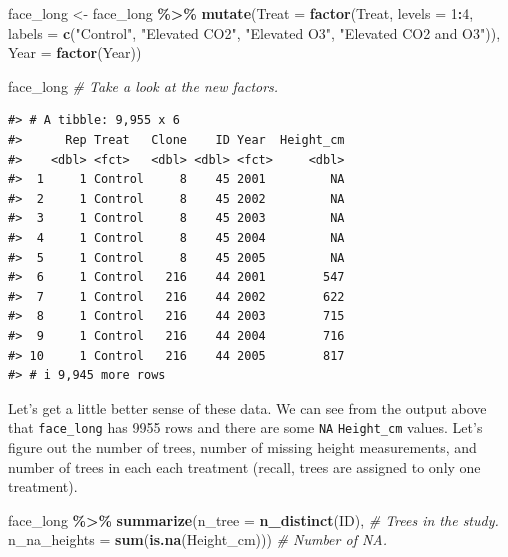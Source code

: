 \documentclass[
  11pt,
]{krantz}
\newenvironment{Shaded}{\begin{snugshade}}{\end{snugshade}}
\newcommand{\CommentTok}[1]{\textcolor[rgb]{0.56,0.35,0.01}{\textit{#1}}}
\newcommand{\DataTypeTok}[1]{\textcolor[rgb]{0.13,0.29,0.53}{#1}}
\newcommand{\DecValTok}[1]{\textcolor[rgb]{0.00,0.00,0.81}{#1}}
\newcommand{\KeywordTok}[1]{\textcolor[rgb]{0.13,0.29,0.53}{\textbf{#1}}}
\newcommand{\NormalTok}[1]{#1}
\newcommand{\OperatorTok}[1]{\textcolor[rgb]{0.81,0.36,0.00}{\textbf{#1}}}
\newcommand{\StringTok}[1]{\textcolor[rgb]{0.31,0.60,0.02}{#1}}
\theoremstyle{definition}
\theoremstyle{definition}
\theoremstyle{definition}
\theoremstyle{definition}
\theoremstyle{remark}
\begin{document}
\begin{Shaded}
\begin{Highlighting}[]
\NormalTok{face\_long \textless{}{-}}\StringTok{ }\NormalTok{face\_long }\OperatorTok{\%\textgreater{}\%}\StringTok{ }
\StringTok{  }\KeywordTok{mutate}\NormalTok{(}\DataTypeTok{Treat =} \KeywordTok{factor}\NormalTok{(Treat, }\DataTypeTok{levels =} \DecValTok{1}\OperatorTok{:}\DecValTok{4}\NormalTok{,}
                        \DataTypeTok{labels =} \KeywordTok{c}\NormalTok{(}\StringTok{"Control"}\NormalTok{, }\StringTok{"Elevated CO2"}\NormalTok{, }
                                   \StringTok{"Elevated O3"}\NormalTok{, }
                                   \StringTok{"Elevated CO2 and O3"}\NormalTok{)),}
         \DataTypeTok{Year =} \KeywordTok{factor}\NormalTok{(Year))}

\NormalTok{face\_long }\CommentTok{\# Take a look at the new factors.}
\end{Highlighting}
\end{Shaded}

\begin{verbatim}
#> # A tibble: 9,955 x 6
#>      Rep Treat   Clone    ID Year  Height_cm
#>    <dbl> <fct>   <dbl> <dbl> <fct>     <dbl>
#>  1     1 Control     8    45 2001         NA
#>  2     1 Control     8    45 2002         NA
#>  3     1 Control     8    45 2003         NA
#>  4     1 Control     8    45 2004         NA
#>  5     1 Control     8    45 2005         NA
#>  6     1 Control   216    44 2001        547
#>  7     1 Control   216    44 2002        622
#>  8     1 Control   216    44 2003        715
#>  9     1 Control   216    44 2004        716
#> 10     1 Control   216    44 2005        817
#> # i 9,945 more rows
\end{verbatim}

Let's get a little better sense of these data. We can see from the output above that \texttt{face\_long} has 9955 rows and there are some \texttt{NA} \texttt{Height\_cm} values. Let's figure out the number of trees, number of missing height measurements, and number of trees in each each treatment (recall, trees are assigned to only one treatment).

\begin{Shaded}
\begin{Highlighting}[]
\NormalTok{face\_long }\OperatorTok{\%\textgreater{}\%}\StringTok{ }
\StringTok{  }\KeywordTok{summarize}\NormalTok{(}\DataTypeTok{n\_tree =} \KeywordTok{n\_distinct}\NormalTok{(ID), }\CommentTok{\# Trees in the study.}
            \DataTypeTok{n\_na\_heights =} \KeywordTok{sum}\NormalTok{(}\KeywordTok{is.na}\NormalTok{(Height\_cm))) }\CommentTok{\# Number of NA.}
\end{Highlighting}
\end{Shaded}
\end{document}
